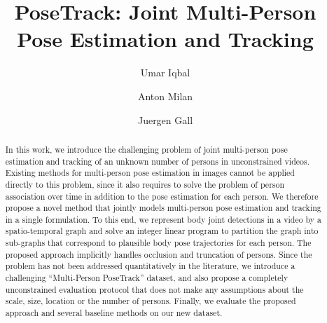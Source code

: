 \documentclass[10pt,twocolumn,letterpaper]{article}
\begin{document}
\newcommand\threecycles{\mathop{3\mhyphen \text{cycles}}}
\newcommand{\KU}{\underline{K}}
\newcommand{\KI}{\overline{K}}




\title{PoseTrack: Joint Multi-Person Pose Estimation and Tracking}
\author[1]{\vspace{-6mm}Umar Iqbal}
\author[2]{Anton Milan}
\author[1]{Juergen Gall\vspace{-3mm}}
\maketitle


\begin{abstract}
 In this work, we introduce the challenging problem of joint multi-person pose estimation and tracking of an unknown number of persons in unconstrained videos. Existing methods for multi-person pose estimation in images cannot be applied directly to this problem, since it also requires to solve the problem of person association over time in addition to the pose estimation for each person. We therefore propose a novel method that jointly models multi-person pose estimation and tracking in a single formulation. To this end, we represent body joint detections in a video by a spatio-temporal graph and solve an integer linear program to partition the graph into sub-graphs that correspond to plausible body pose trajectories for each person. The proposed approach implicitly handles occlusion and truncation of persons. Since the problem has not been addressed quantitatively in the literature, we introduce a challenging ``Multi-Person PoseTrack'' dataset, and also propose a completely unconstrained evaluation protocol that does not make any assumptions about the scale, size, location or the number of persons. Finally, we evaluate the proposed approach and several baseline methods on our new dataset. 

\end{abstract}
\end{document}
